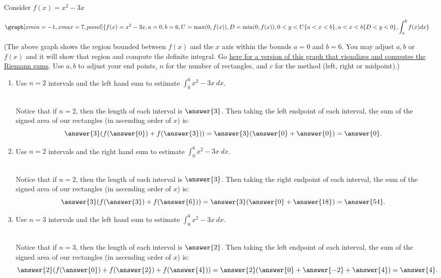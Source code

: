 \documentclass{ximera}
\begin{document}
\begin{question}
Consider $f(x)=x^2-3x$

\begin{onlineOnly}
$$\graph[xmin=-1, xmax=7, panel]{f(x)=x^2-3x,a=0,b=6,U=\max(0, f(x)), D=\min(0, f(x)), 0<y<U\{a<x<b\},a<x<b\{D<y<0\},\int_a^b f(x) dx}$$
\end{onlineOnly}
(The above graph shows the region bounded between $f(x)$ and the $x$ axis within the bounds $a=0$ and $b=6$.  You may adjust $a,b$ or $f(x)$ and it will show that region and compute the definite integral. Go  \href{https://www.desmos.com/calculator/o2jdhyeocq}{here for a version of this graph that visualizes and computes  the Riemann sums}.  Use $a, b$ to adjust your end points, $n$ for the number of rectangles, and $c$ for the method (left, right or midpoint).)


\begin{enumerate}
\item Use $n=2$ intervals and the left hand sum to estimate $\displaystyle\int_0^6 x^2-3x\ dx$. \\ \\
\begin{explanation}
Notice that if $n=2$, then the length of each interval is $\answer{3}$.  Then taking the left endpoint of each interval, the sum of the signed area of our rectangles (in ascending order of $x$) is: $$\answer{3}(f(\answer{0})+f(\answer{3}))=\answer{3}(\answer{0}+\answer{0})=\answer{0}.$$
\end{explanation}

\item Use $n=2$ intervals and the right hand sum to estimate $\displaystyle\int_0^6 x^2-3x\ dx$. \\ \\
\begin{explanation}
Notice that if $n=2$, then the length of each interval is $\answer{3}$.  Then taking the right endpoint of each interval, the sum of the signed area of our rectangles (in ascending order of $x$) is: $$\answer{3}(f(\answer{3})+f(\answer{6}))=\answer{3}(\answer{0}+\answer{18})=\answer{54}.$$

\end{explanation}

\item Use $n=3$ intervals and the left hand sum to estimate $\displaystyle\int_0^6 x^2-3x\ dx$. \\ \\
\begin{explanation}
Notice that if $n=3$, then the length of each interval is $\answer{2}$.  Then taking the left endpoint of each interval, the sum of the signed area of our rectangles (in ascending order of $x$) is: $$\answer{2}(f(\answer{0})+f(\answer{2})+f(\answer{4}))=\answer{2}(\answer{0}+\answer{-2}+\answer{4})=\answer{4}.$$


\end{explanation}
\end{enumerate}
\end{question}
\end{document}

